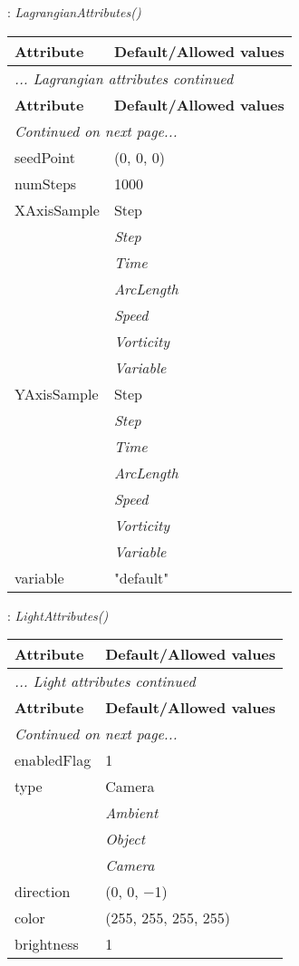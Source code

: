 \documentclass[10pt,a4paper]{report}
\begin{document}
\newpage

{}
: {\it LagrangianAttributes() }\\[-3mm]

\begin{longtable}{ll}
{\bf Attribute} & {\bf Default/Allowed values} \\
\hline \hline
\endfirsthead
\multicolumn{2}{l}{{\it ... Lagrangian attributes continued}} \\
{\bf Attribute} & {\bf Default/Allowed values} \\
\hline \hline
\endhead
\hline
\multicolumn{2}{l}{{\it Continued on next page...}} \\
\endfoot
\hline
\endlastfoot

seedPoint  &  (0, 0, 0) \\
numSteps  &  1000 \\
XAxisSample  &  Step   \\
 & {\it  Step} \\
 & {\it  Time} \\
 & {\it  ArcLength} \\
 & {\it  Speed} \\
 & {\it  Vorticity} \\
 & {\it  Variable} \\
YAxisSample  &  Step   \\
 & {\it  Step} \\
 & {\it  Time} \\
 & {\it  ArcLength} \\
 & {\it  Speed} \\
 & {\it  Vorticity} \\
 & {\it  Variable} \\
variable  &  "default" \\
\end{longtable}

\newpage

{}
: {\it LightAttributes() }\\[-3mm]

\begin{longtable}{ll}
{\bf Attribute} & {\bf Default/Allowed values} \\
\hline \hline
\endfirsthead
\multicolumn{2}{l}{{\it ... Light attributes continued}} \\
{\bf Attribute} & {\bf Default/Allowed values} \\
\hline \hline
\endhead
\hline
\multicolumn{2}{l}{{\it Continued on next page...}} \\
\endfoot
\hline
\endlastfoot

enabledFlag  &  1 \\
type  &  Camera   \\
 & {\it  Ambient} \\
 & {\it  Object} \\
 & {\it  Camera} \\
direction  &  (0, 0, $-$1) \\
color  &  (255, 255, 255, 255) \\
brightness  &  1 \\
\end{longtable}
\end{document}
